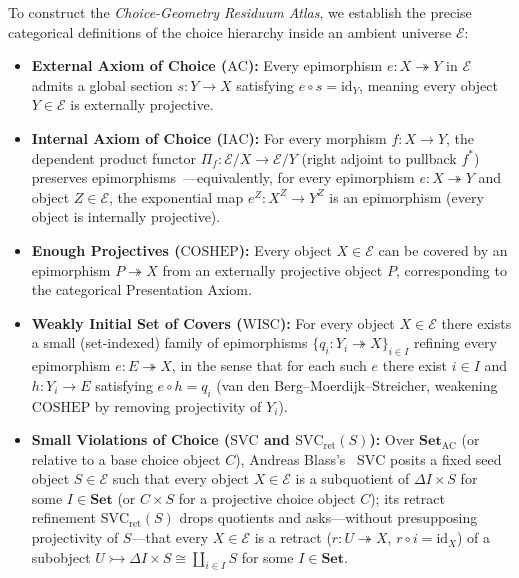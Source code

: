 To construct the \emph{Choice-Geometry Residuum Atlas}, we establish the precise categorical definitions of the choice hierarchy inside an ambient universe $\mathcal{E}$:

\begin{itemize}

  \item \textbf{External Axiom of Choice ($\mathrm{AC}$):} Every epimorphism $e: X \twoheadrightarrow Y$ in $\mathcal{E}$ admits a global section $s: Y \to X$ satisfying $e \circ s = \mathrm{id}_Y$, meaning every object $Y \in \mathcal{E}$ is externally projective.

  \item \textbf{Internal Axiom of Choice ($\mathrm{IAC}$):} For every morphism $f: X \to Y$, the dependent product functor $\Pi_f: \mathcal{E}/X \to \mathcal{E}/Y$ (right adjoint to pullback $f^*$) preserves epimorphisms~\cite{Johnstone02}---equivalently, for every epimorphism $e: X \twoheadrightarrow Y$ and object $Z \in \mathcal{E}$, the exponential map $e^Z: X^Z \to Y^Z$ is an epimorphism (every object is internally projective).

  \item \textbf{Enough Projectives ($\mathrm{COSHEP}$):} Every object $X \in \mathcal{E}$ can be covered by an epimorphism $P \twoheadrightarrow X$ from an externally projective object $P$, corresponding to the categorical Presentation Axiom.

  \item \textbf{Weakly Initial Set of Covers ($\mathrm{WISC}$):} For every object $X \in \mathcal{E}$ there exists a small (set-indexed) family of epimorphisms $\{q_i : Y_i \twoheadrightarrow X\}_{i \in I}$ refining every epimorphism $e : E \twoheadrightarrow X$, in the sense that for each such $e$ there exist $i \in I$ and $h : Y_i \to E$ satisfying $e \circ h = q_i$ (van den Berg--Moerdijk--Streicher, weakening $\mathrm{COSHEP}$ by removing projectivity of $Y_i$).

  \item \textbf{Small Violations of Choice ($\mathrm{SVC}$ and $\mathrm{SVC}_{\mathrm{ret}}(S)$):} Over $\mathbf{Set}_{\mathrm{AC}}$ (or relative to a base choice object $C$), Andreas Blass's~\cite{Blass79} $\mathrm{SVC}$ posits a fixed seed object $S \in \mathcal{E}$ such that every object $X \in \mathcal{E}$ is a subquotient of $\Delta I \times S$ for some $I \in \mathbf{Set}$ (or $C \times S$ for a projective choice object $C$); its retract refinement $\mathrm{SVC}_{\mathrm{ret}}(S)$ drops quotients and asks---without presupposing projectivity of $S$---that every $X \in \mathcal{E}$ is a retract ($r : U \twoheadrightarrow X$, $r \circ i = \mathrm{id}_X$) of a subobject $U \rightarrowtail \Delta I \times S \cong \coprod_{i \in I} S$ for some $I \in \mathbf{Set}$.


\end{itemize}
